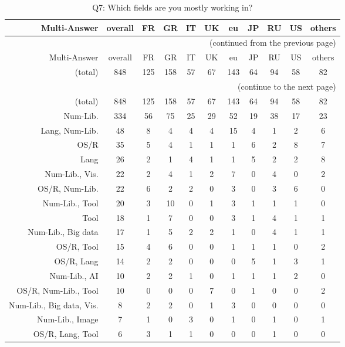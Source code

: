 \clearpage%
{\footnotesize\begin{landscape}%
\begin{longtable}[htb]{r|c|c|c|c|c|c|c|c|c|c}%
\caption{Q7: Which fields are you mostly working in?}%
\label{tab:Q7-mans} \\%
\hline%
Multi-Answer & overall & FR & GR & IT & UK & eu & JP & RU & US & others \\
 \hline%
\endfirsthead%
\multicolumn{11}{r}{(continued from the previous page)}\\%
\hline%
Multi-Answer & overall & FR & GR & IT & UK & eu & JP & RU & US & others \\
 \hline%
\endhead%
\hline%
(total) & 848 & 125 & 158 & 57 & 67 & 143 & 64 & 94 & 58 & 82 \\%
\hline%
\multicolumn{11}{r}{(continue to the next page)}\\%
\endfoot%
\hline%
(total) & 848 & 125 & 158 & 57 & 67 & 143 & 64 & 94 & 58 & 82 \\%
\hline%
\endlastfoot%
\hline%
{Num-Lib.} & 334 & 56 & 75 & 25 & 29 & 52 & 19 & 38 & 17 & 23 \\%
{Lang, Num-Lib.} & 48 & 8 & 4 & 4 & 4 & 15 & 4 & 1 & 2 & 6 \\%
{OS/R} & 35 & 5 & 4 & 1 & 1 & 1 & 6 & 2 & 8 & 7 \\%
{Lang} & 26 & 2 & 1 & 4 & 1 & 1 & 5 & 2 & 2 & 8 \\%
{Num-Lib., Vis.} & 22 & 2 & 4 & 1 & 2 & 7 & 0 & 4 & 0 & 2 \\%
{OS/R, Num-Lib.} & 22 & 6 & 2 & 2 & 0 & 3 & 0 & 3 & 6 & 0 \\%
{Num-Lib., Tool} & 20 & 3 & 10 & 0 & 1 & 3 & 1 & 1 & 1 & 0 \\%
{Tool} & 18 & 1 & 7 & 0 & 0 & 3 & 1 & 4 & 1 & 1 \\%
{Num-Lib., Big data} & 17 & 1 & 5 & 2 & 2 & 1 & 0 & 4 & 1 & 1 \\%
{OS/R, Tool} & 15 & 4 & 6 & 0 & 0 & 1 & 1 & 1 & 0 & 2 \\%
{OS/R, Lang} & 14 & 2 & 2 & 0 & 0 & 0 & 5 & 1 & 3 & 1 \\%
{Num-Lib., AI} & 10 & 2 & 2 & 1 & 0 & 1 & 1 & 1 & 2 & 0 \\%
{OS/R, Num-Lib., Tool} & 10 & 0 & 0 & 0 & 7 & 0 & 1 & 0 & 0 & 2 \\%
{Num-Lib., Big data, Vis.} & 8 & 2 & 2 & 0 & 1 & 3 & 0 & 0 & 0 & 0 \\%
{Num-Lib., Image} & 7 & 1 & 0 & 3 & 0 & 1 & 0 & 1 & 0 & 1 \\%
{OS/R, Lang, Tool} & 6 & 3 & 1 & 1 & 0 & 0 & 0 & 1 & 0 & 0 \\%

\end{longtable}
\end{landscape}}

